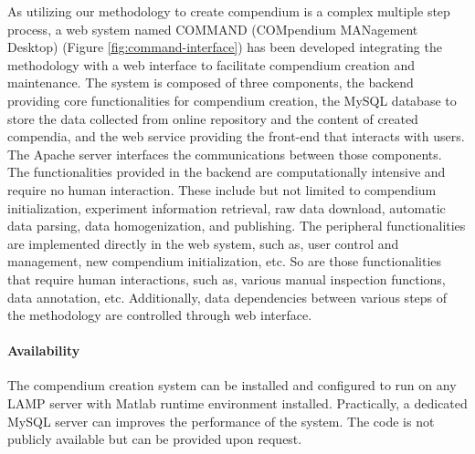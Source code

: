 As utilizing our methodology to create compendium is a complex multiple step
process, a web system named COMMAND (COMpendium MANagement Desktop) (Figure 
\ref{fig:command-interface}) has been developed integrating the methodology 
with a web interface to facilitate compendium creation and maintenance.
%
The system is composed of three components, the backend providing core
functionalities for compendium creation, the MySQL database to store the data
collected from online repository and the content of created compendia, and the
web service providing the front-end that interacts with users.  The Apache
server interfaces the communications between those components.
%
The functionalities provided in the backend are computationally intensive and
require no human interaction.  These include but not limited to compendium
initialization, experiment information retrieval, raw data download, automatic
data parsing, data homogenization, and publishing.
%
The peripheral functionalities are implemented directly in the web system,
such as, user control and management, new compendium initialization, etc.  So
are those functionalities that require human interactions, such as, various manual
inspection functions, data annotation, etc.  Additionally, data dependencies
between various steps of the methodology are controlled through web interface.


\paragraph{Availability} 
The compendium creation system can be installed and configured to run on any
LAMP server with Matlab runtime environment installed.  Practically, a
dedicated MySQL server can improves the performance of the system.
The code is not publicly available but can be provided upon request.



%
%
%
%



